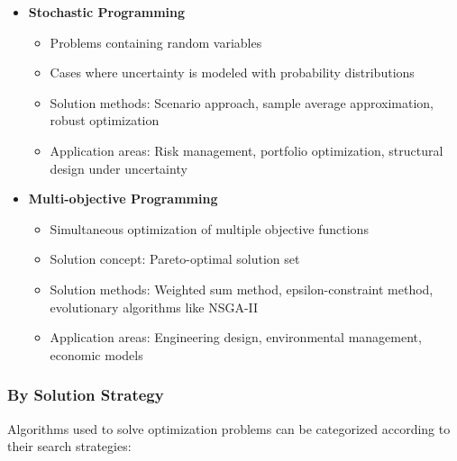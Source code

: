 \begin{itemize}
    \item \textbf{Stochastic Programming}
        \begin{itemize}
            \item Problems containing random variables
            \item Cases where uncertainty is modeled with probability distributions
            \item Solution methods: Scenario approach, sample average approximation, robust optimization
            \item Application areas: Risk management, portfolio optimization, structural design under uncertainty
        \end{itemize}
        
    \item \textbf{Multi-objective Programming}
        \begin{itemize}
            \item Simultaneous optimization of multiple objective functions
            \item Solution concept: Pareto-optimal solution set
            \item Solution methods: Weighted sum method, epsilon-constraint method, evolutionary algorithms like NSGA-II
            \item Application areas: Engineering design, environmental management, economic models
        \end{itemize}
\end{itemize}


\subsubsection{By Solution Strategy}
Algorithms used to solve optimization problems can be categorized according to their search strategies:

